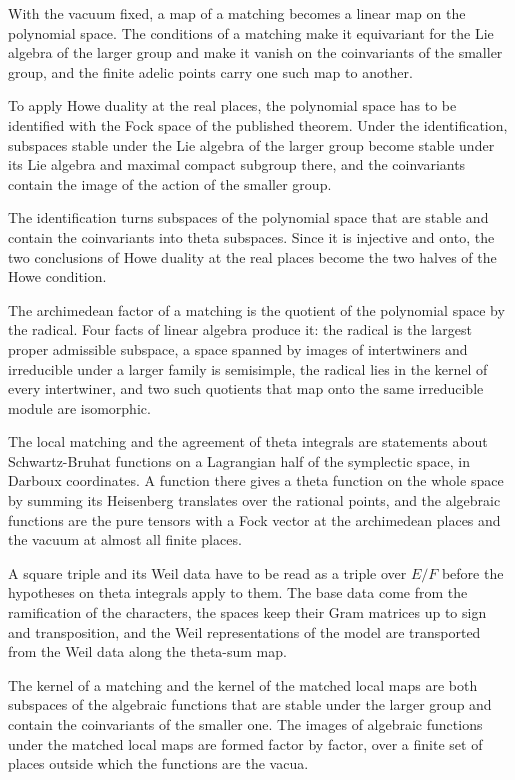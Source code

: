 With the vacuum fixed, a map of a matching becomes a linear map on the
polynomial space. The conditions of a matching make it equivariant for the
Lie algebra of the larger group and make it vanish on the coinvariants of the
smaller group, and the finite adelic points carry one such map to another.

To apply Howe duality at the real places, the polynomial space has to be
identified with the Fock space of the published theorem. Under the
identification, subspaces stable under the Lie algebra of the larger group
become stable under its Lie algebra and maximal compact subgroup there, and
the coinvariants contain the image of the action of the smaller group.

The identification turns subspaces of the polynomial space that are stable and
contain the coinvariants into theta subspaces. Since it is injective and onto,
the two conclusions of Howe duality at the real places become the two halves of
the Howe condition.

The archimedean factor of a matching is the quotient of the polynomial space by
the radical. Four facts of linear algebra produce it: the radical is the
largest proper admissible subspace, a space spanned by images of intertwiners
and irreducible under a larger family is semisimple, the radical lies in the
kernel of every intertwiner, and two such quotients that map onto the same
irreducible module are isomorphic.

The local matching and the agreement of theta integrals are statements about
Schwartz-Bruhat functions on a Lagrangian half of the symplectic space, in
Darboux coordinates. A function there gives a theta function on the whole
space by summing its Heisenberg translates over the rational points, and the
algebraic functions are the pure tensors with a Fock vector at the
archimedean places and the vacuum at almost all finite places.

A square triple and its Weil data have to be read as a triple over $E/F$
before the hypotheses on theta integrals apply to them. The base data come
from the ramification of the characters, the spaces keep their Gram matrices
up to sign and transposition, and the Weil representations of the model are
transported from the Weil data along the theta-sum map.

The kernel of a matching and the kernel of the matched local maps are both
subspaces of the algebraic functions that are stable under the larger group
and contain the coinvariants of the smaller one. The images of algebraic
functions under the matched local maps are formed factor by factor, over a
finite set of places outside which the functions are the vacua.

